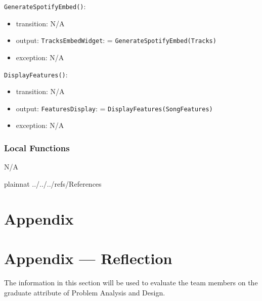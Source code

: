 \documentclass[12pt, titlepage]{article}
\begin{document}
\noindent \texttt{GenerateSpotifyEmbed()}:
\begin{itemize}
\item transition: N/A
\item output: \texttt{Tracks\textunderscore Embed\textunderscore Widget}: = \texttt{GenerateSpotifyEmbed(Tracks)}
\item exception: N/A
\end{itemize}

\noindent \texttt{DisplayFeatures()}:
\begin{itemize}
\item transition: N/A
\item output: \texttt{Features\textunderscore Display}: = \texttt{DisplayFeatures(Song\textunderscore Features)}
\item exception: N/A
\end{itemize}

\subsubsection{Local Functions}
N/A

\newpage

 {plainnat}
 {../../../refs/References}

\newpage

\section{Appendix} \label{Appendix}


\newpage{}

\section*{Appendix --- Reflection}


The information in this section will be used to evaluate the team members on the
graduate attribute of Problem Analysis and Design.


\end{document}
